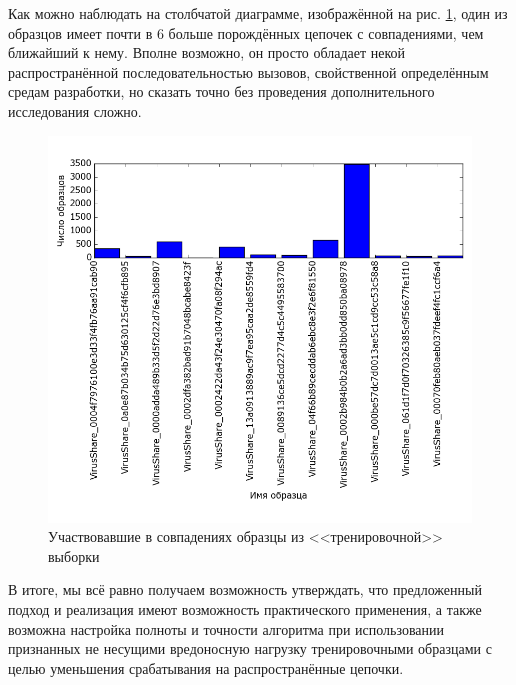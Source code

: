 Как можно наблюдать на столбчатой диаграмме, изображённой на рис. \ref {fig:efficiency}, один из образцов имеет почти в 6 больше порождённых цепочек с совпадениями, чем ближайший к нему. Вполне возможно, он просто обладает некой распространённой последовательностью вызовов, свойственной определённым средам разработки, но сказать точно без проведения дополнительного исследования сложно.
    
\begin {figure}[ht]
	\centering
	\includegraphics[width=\linewidth] {img/most_used_kbase_samples.png}
	\caption {Участвовавшие в совпадениях образцы из <<тренировочной>> выборки}
	\label {fig:efficiency}
\end {figure}

В итоге, мы всё равно получаем возможность утверждать, что предложенный подход и реализация имеют возможность практического применения, а также возможна настройка полноты и точности алгоритма при использовании признанных не несущими вредоносную нагрузку тренировочными образцами с целью уменьшения срабатывания на распространённые цепочки.
